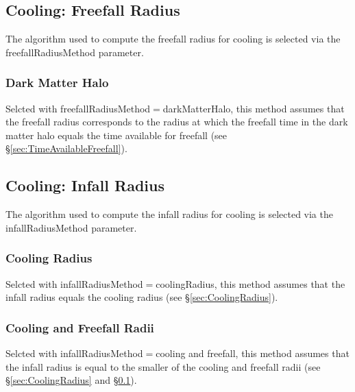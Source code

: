\subsection{Cooling: Freefall Radius}\label{sec:CoolingFreefallRadius}

The algorithm used to compute the freefall radius for cooling is selected via the {\normalfont \ttfamily freefallRadiusMethod} parameter.

\subsubsection{Dark Matter Halo}

Selcted with {\normalfont \ttfamily freefallRadiusMethod}$=${\normalfont \ttfamily darkMatterHalo}, this method assumes that the freefall radius corresponds to the radius at which the freefall time in the dark matter halo equals the time available for freefall (see \S\ref{sec:TimeAvailableFreefall}).

\subsection{Cooling: Infall Radius}\label{sec:CoolingInfallRadius}

The algorithm used to compute the infall radius for cooling is selected via the {\normalfont \ttfamily infallRadiusMethod} parameter.

\subsubsection{Cooling Radius}

Selcted with {\normalfont \ttfamily infallRadiusMethod}$=${\normalfont \ttfamily coolingRadius}, this method assumes that the infall radius equals the cooling radius (see \S\ref{sec:CoolingRadius}).

\subsubsection{Cooling and Freefall Radii}

Selcted with {\normalfont \ttfamily infallRadiusMethod}$=${\normalfont \ttfamily cooling and freefall}, this method assumes that the infall radius is equal to the smaller of the cooling and freefall radii (see \S\ref{sec:CoolingRadius} and \S\ref{sec:CoolingFreefallRadius}).

